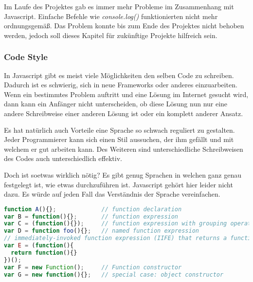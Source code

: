 
Im Laufe des Projektes gab es immer mehr Probleme im Zusammenhang mit Javascript. Einfache Befehle wie \textit{console.log()} funktionierten nicht mehr ordnungsgemäß. Das Problem konnte bis zum Ende des Projektes nicht behoben werden, jedoch soll dieses Kapitel für zukünftige Projekte hilfreich sein.

\subsubsection{Code Style}
In Javascript gibt es meist viele Möglichkeiten den selben Code zu schreiben. Dadurch ist es schwierig, sich in neue Frameworks oder anderes einzuarbeiten. Wenn ein bestimmtes Problem auftritt und eine Lösung im Internet gesucht wird, dann kann ein Anfänger nicht unterscheiden, ob diese Lösung nun nur eine andere Schreibweise einer anderen Lösung ist oder ein komplett anderer Ansatz. 

Es hat natürlich auch Vorteile eine Sprache so schwach reguliert zu gestalten. Jeder Programmierer kann sich einen Stil aussuchen, der ihm gefällt und mit welchem er gut arbeiten kann. Des Weiteren sind unterschiedliche Schreibweisen des Codes auch unterschiedlich effektiv. 

Doch ist soetwas wirklich nötig? Es gibt genug Sprachen in welchen ganz genau festgelegt ist, wie etwas durchzuführen ist. Javascript gehört hier leider nicht dazu. Es würde auf jeden Fall das Verständnis der Sprache vereinfachen. 

\begin{lstlisting}[caption = Unterschiedliche Möglichkeiten eine Funktion zu deklarieren\cite{JSOP1}, label = jsopfn, language=Javascript]
function A(){};             // function declaration
var B = function(){};       // function expression
var C = (function(){});     // function expression with grouping operators
var D = function foo(){};   // named function expression
// immediately-invoked function expression (IIFE) that returns a function
var E = (function(){ 
  return function(){}
})();
var F = new Function();     // Function constructor
var G = new function(){};   // special case: object constructor

\end{lstlisting}

